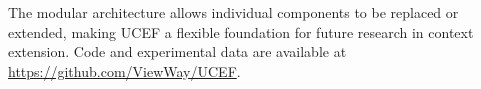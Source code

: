 \documentclass[11pt,a4paper]{article}
\newcommand{\ucef}{\textsf{UCEF}}
\begin{document}
The modular architecture allows individual components to be replaced or
extended, making \ucef{} a flexible foundation for future research in
context extension.  Code and experimental data are available at
\url{https://github.com/ViewWay/UCEF}.




\end{document}
